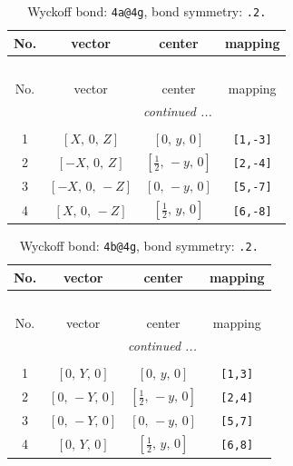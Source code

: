 \documentclass[fleqn,8pt]{jsarticle}
\begin{document}
\begin{longtable}{cccc}
\caption{Wyckoff bond: {\tt 4a@4g}, bond symmetry: {\tt .2.}}
 \\
 \hline \hline
No. & vector & center & mapping \\ \hline \endfirsthead

\multicolumn{3}{l}{\tablename\ \thetable{}} \\
 \hline \hline
No. & vector & center & mapping \\ \hline \endhead

 \hline \hline
\multicolumn{3}{r}{\footnotesize\it continued ...} \\ \endfoot

 \hline \hline
\multicolumn{3}{r}{} \\ \endlastfoot

1 & $\left[ X,\, 0,\, Z \right]$ & $\left[ 0,\, y,\, 0 \right]$ & {\tt [1,-3]} \\ \hline
2 & $\left[ - X,\, 0,\, Z \right]$ & $\left[ \frac{1}{2},\, - y,\, 0 \right]$ & {\tt [2,-4]} \\ \hline
3 & $\left[ - X,\, 0,\, - Z \right]$ & $\left[ 0,\, - y,\, 0 \right]$ & {\tt [5,-7]} \\ \hline
4 & $\left[ X,\, 0,\, - Z \right]$ & $\left[ \frac{1}{2},\, y,\, 0 \right]$ & {\tt [6,-8]} \\
\end{longtable}
\renewcommand{\arraystretch}{1.2}
\begin{longtable}{cccc}
\caption{Wyckoff bond: {\tt 4b@4g}, bond symmetry: {\tt .2.}}
 \\
 \hline \hline
No. & vector & center & mapping \\ \hline \endfirsthead

\multicolumn{3}{l}{\tablename\ \thetable{}} \\
 \hline \hline
No. & vector & center & mapping \\ \hline \endhead

 \hline \hline
\multicolumn{3}{r}{\footnotesize\it continued ...} \\ \endfoot

 \hline \hline
\multicolumn{3}{r}{} \\ \endlastfoot

1 & $\left[ 0,\, Y,\, 0 \right]$ & $\left[ 0,\, y,\, 0 \right]$ & {\tt [1,3]} \\ \hline
2 & $\left[ 0,\, - Y,\, 0 \right]$ & $\left[ \frac{1}{2},\, - y,\, 0 \right]$ & {\tt [2,4]} \\ \hline
3 & $\left[ 0,\, - Y,\, 0 \right]$ & $\left[ 0,\, - y,\, 0 \right]$ & {\tt [5,7]} \\ \hline
4 & $\left[ 0,\, Y,\, 0 \right]$ & $\left[ \frac{1}{2},\, y,\, 0 \right]$ & {\tt [6,8]} \\
\end{longtable}
\end{document}
